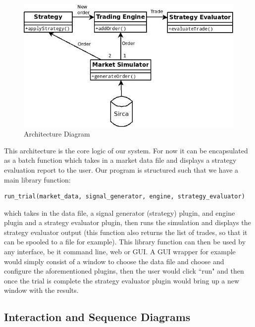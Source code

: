 \documentclass{article}
\begin{document}
\begin{figure}
  \centering
  \includegraphics[width=\textwidth]{architecture}
  \caption{Architecture Diagram}
\end{figure}

This architecture is the core logic of our system. For now it can be encapsulated as a batch function which takes in a market data file and displays a strategy evaluation report to the user. Our program is structured such that we have a main library function:
\begin{verbatim}
run_trial(market_data, signal_generator, engine, strategy_evaluator)
\end{verbatim}

which takes in the data file, a signal generator (strategy) plugin, and engine plugin and a strategy evaluator plugin, then runs the simulation and displays the strategy evaluator output (this function also returns the list of trades, so that it can be spooled to a file for example). This library function can then be used by any interface, be it command line, web or GUI\@. A GUI wrapper for example would simply consist of a window to choose the data file and choose and configure the aforementioned plugins, then the user would click ``run" and then once the trial is complete the strategy evaluator plugin would bring up a new window with the results.

\subsection{Interaction and Sequence Diagrams}
\end{document}
